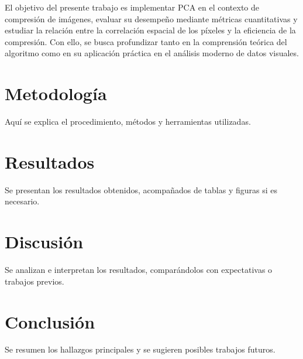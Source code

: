 \documentclass[12pt]{article}
\begin{document}
El objetivo del presente trabajo es implementar PCA en el contexto de compresión de imágenes, evaluar su desempeño mediante métricas cuantitativas y estudiar la relación entre la correlación espacial de los píxeles y la eficiencia de la compresión. Con ello, se busca profundizar tanto en la comprensión teórica del algoritmo como en su aplicación práctica en el análisis moderno de datos visuales.

\section{Metodología}
Aquí se explica el procedimiento, métodos y herramientas utilizadas.

\section{Resultados}
Se presentan los resultados obtenidos, acompañados de tablas y figuras si es necesario.

\section{Discusión}
Se analizan e interpretan los resultados, comparándolos con expectativas o trabajos previos.

\section{Conclusión}
Se resumen los hallazgos principales y se sugieren posibles trabajos futuros.
\end{document}
